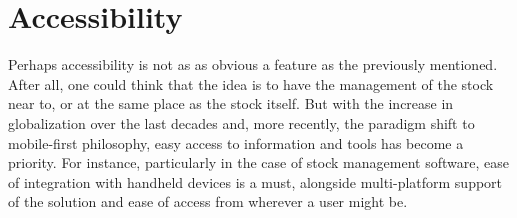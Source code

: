 \section{Accessibility}
Perhaps accessibility is not as as obvious a feature as the previously mentioned. After all, one could think that the idea is to have the management of the stock near to, or at the same place as the stock itself. But with the increase in globalization over the last decades and, more recently, the paradigm shift to mobile-first philosophy, easy access to information and tools has become a priority. For instance, particularly in the case of stock management software, ease of integration with handheld devices is a must, alongside multi-platform support of the solution and ease of access from wherever a user might be.